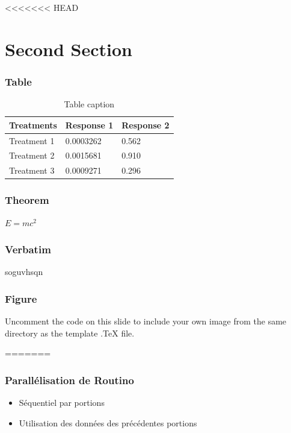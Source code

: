 <<<<<<< HEAD
\section{Second Section}

\begin{frame}
\frametitle{Table}
\begin{table}
\begin{tabular}{l l l}
\toprule
\textbf{Treatments} & \textbf{Response 1} & \textbf{Response 2}\\
\midrule
Treatment 1 & 0.0003262 & 0.562 \\
Treatment 2 & 0.0015681 & 0.910 \\
Treatment 3 & 0.0009271 & 0.296 \\
\bottomrule
\end{tabular}
\caption{Table caption}
\end{table}
\end{frame}


\begin{frame}
\frametitle{Theorem}
\begin{theorem}
$E = mc^2$
\end{theorem}
\end{frame}


\begin{frame}[fragile] %
\frametitle{Verbatim}
\begin{example}
soguvhsqn
\end{example}
\end{frame}


\begin{frame}
\frametitle{Figure}
Uncomment the code on this slide to include your own image from the same directory as the template .TeX file.
\end{frame}
=======

\begin{frame}
  \frametitle{Parallélisation de Routino}
  \begin{itemize}
  \item Séquentiel par portions
    \vspace{1em}
  \item Utilisation des données des précédentes portions
  \end{itemize}
\end{frame}

